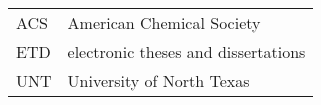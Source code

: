 \chapter*{\AbbChap}


\setcounter{table}{0}

\begin{table}[h]
\centering
{}
\begin{tabular}{ p{1.5in} p{4.5in}  }
\toprule
ACS                             & American Chemical Society \\
ETD                             & electronic theses and dissertations \\
UNT                             & University of North Texas \\
\bottomrule
\end{tabular}
\end{table}



%

